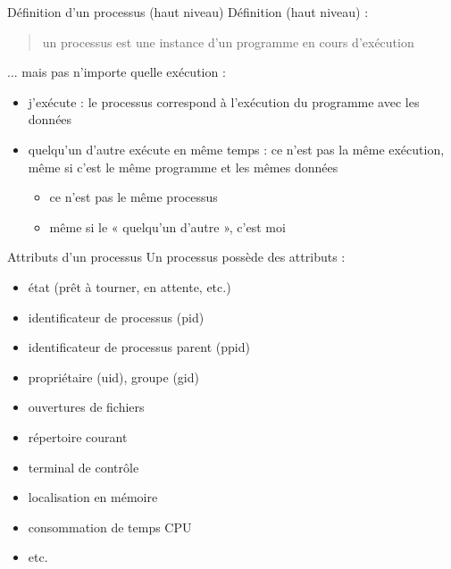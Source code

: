 \def\inc{inc1-4-ps}




\begin {frame} {Définition d'un processus (haut niveau)}
    Définition (haut niveau) :

    \begin {quote}
	un processus est une instance d'un programme en cours d'exécution
    \end {quote}

    ... mais pas n'importe quelle exécution :

    \begin {itemize}
	\item j'exécute  : le processus correspond à
	    l'exécution du programme  avec les données

	\item quelqu'un d'autre exécute  en même
	    temps : ce n'est pas la même exécution, même si c'est le
	    même programme et les mêmes données

	    \begin {itemize}
		\item ce n'est pas le même processus
		\item même si le « quelqu'un d'autre », c'est moi
	    \end {itemize}

    \end {itemize}
\end {frame}

\begin {frame} {Attributs d'un processus}
    Un processus possède des attributs :

    \begin {itemize}
	\fB
	\item état (prêt à tourner, en attente, etc.)
	\item identificateur de processus (pid)
	\item identificateur de processus parent (ppid)
	\item propriétaire (uid), groupe (gid)
	\item ouvertures de fichiers
	\item répertoire courant
	\item terminal de contrôle
	\item localisation en mémoire
	\item consommation de temps CPU
	\item etc.
    \end {itemize}

\end {frame}

